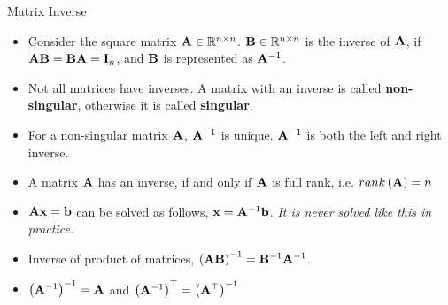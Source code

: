 \documentclass[aspectratio=169]{beamer}
\let\olditem\item
\renewcommand{\item}{\setlength{\itemsep}{\fill}\olditem}
\def\mf{\ensuremath\mathbf}
\begin{document}
\begin{frame}[t]{Matrix Inverse}
  \begin{small}
  \begin{itemize}
      \item Consider the square matrix $\mf{A} \in \mathbb{R}^{n \times n}$. $\mf{B} \in \mathbb{R}^{n \times n}$ is the inverse of $\mf{A}$, if $\mf{AB} = \mf{BA} = \mf{I}_n$, and $\mf{B}$ is represented as $\mf{A}^{-1}$.
      \item Not all matrices have inverses. A matrix with an inverse is called \textbf{non-singular}, otherwise it is called \textbf{singular}.
      \item For a non-singular matrix $\mf{A}$, $\mf{A}^{-1}$ is unique. $\mf{A}^{-1}$ is both the left and right inverse.
      \item A matrix $\mf{A}$ has an inverse, if and only if $\mf{A}$ is full rank, i.e. $rank\left(\mf{A}\right) = n$
      \item $\mf{Ax} = \mf{b}$ can be solved as follows, $\mf{x} = \mf{A}^{-1}\mf{b}$. \textit{It is never solved like this in practice.}
      \item Inverse of product of matrices, $\left(\mf{AB}\right)^{-1} = \mf{B}^{-1}\mf{A}^{-1}$.
      \item $\left(\mf{A}^{-1}\right)^{-1} = \mf{A}$ and $\left(\mf{A}^{-1}\right)^{\top} = \left(\mathbf{A}^{\top}\right)^{-1}$
\end{itemize}
\end{small}
\end{frame}
\end{document}

